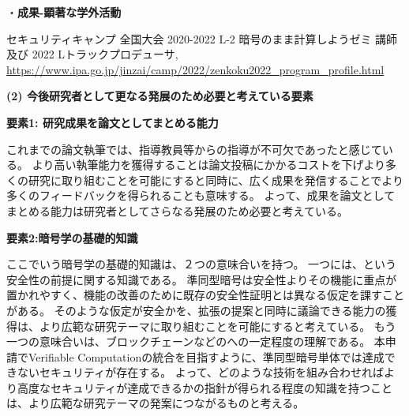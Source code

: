 \noindent・\textbf{成果-顕著な学外活動}

\begin{enumerate}[label={[\arabic*]},ref=\arabic*,leftmargin=0.5cm]
    \setcounter{enumi}{12}
	\item セキュリティキャンプ 全国大会 2020-2022 L-2 暗号のまま計算しようゼミ 講師 及び 2022 Lトラックプロデューサ, \url{https://www.ipa.go.jp/jinzai/camp/2022/zenkoku2022_program_profile.html}\label{achieve:seccamp}
\end{enumerate}

\vspace{5mm}
\noindent\textbf{(2) 今後研究者として更なる発展のため必要と考えている要素}



\noindent\textbf{要素1: 研究成果を論文としてまとめる能力}

これまでの論文執筆では、指導教員等からの指導が不可欠であったと感じている。
より高い執筆能力を獲得することは論文投稿にかかるコストを下げより多くの研究に取り組むことを可能にすると同時に、広く成果を発信することでより多くのフィードバックを得られることも意味する。
よって、成果を論文としてまとめる能力は研究者としてさらなる発展のため必要と考えている。

\noindent\textbf{要素2:暗号学の基礎的知識}

ここでいう暗号学の基礎的知識は、２つの意味合いを持つ。
一つには、という安全性の前提に関する知識である。
準同型暗号は安全性よりその機能に重点が置かれやすく、機能の改善のために既存の安全性証明とは異なる仮定を課すことがある。
そのような仮定が安全かを、拡張の提案と同時に議論できる能力の獲得は、より広範な研究テーマに取り組むことを可能にすると考えている。
もう一つの意味合いは、ブロックチェーンなどのへの一定程度の理解である。
本申請でVerifiable Computationの統合を目指すように、準同型暗号単体では達成できないセキュリティが存在する。
よって、どのような技術を組み合わせればより高度なセキュリティが達成できるかの指針が得られる程度の知識を持つことは、より広範な研究テーマの発案につながるものと考える。




